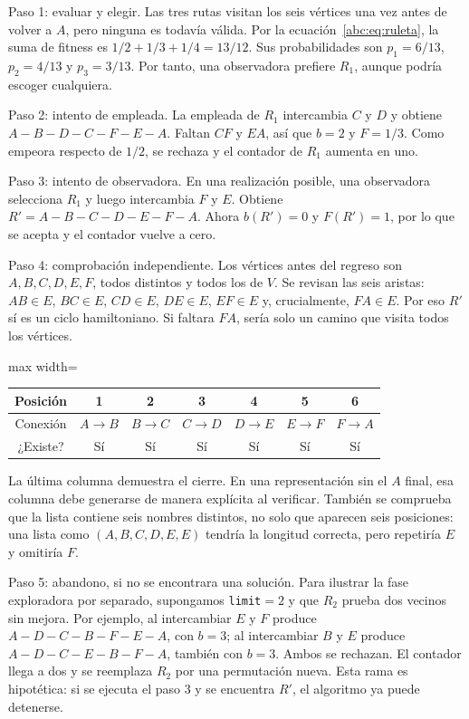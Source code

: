 \noindent Paso 1: evaluar y elegir. Las tres rutas visitan los seis vértices una vez antes de volver a $A$, pero ninguna es todavía válida. Por la ecuación~\eqref{abc:eq:ruleta}, la suma de fitness es $1/2+1/3+1/4=13/12$. Sus probabilidades son $p_1=6/13$, $p_2=4/13$ y $p_3=3/13$. Por tanto, una observadora prefiere $R_1$, aunque podría escoger cualquiera.

\noindent Paso 2: intento de empleada. La empleada de $R_1$ intercambia $C$ y $D$ y obtiene $A-B-D-C-F-E-A$. Faltan $CF$ y $EA$, así que $b=2$ y $F=1/3$. Como empeora respecto de $1/2$, se rechaza y el contador de $R_1$ aumenta en uno.

\noindent Paso 3: intento de observadora. En una realización posible, una observadora selecciona $R_1$ y luego intercambia $F$ y $E$. Obtiene $R'=A-B-C-D-E-F-A$. Ahora $b(R')=0$ y $F(R')=1$, por lo que se acepta y el contador vuelve a cero.

\noindent Paso 4: comprobación independiente. Los vértices antes del regreso son $A,B,C,D,E,F$, todos distintos y todos los de $V$. Se revisan las seis aristas: $AB\in E$, $BC\in E$, $CD\in E$, $DE\in E$, $EF\in E$ y, crucialmente, $FA\in E$. Por eso $R'$ sí es un ciclo hamiltoniano. Si faltara $FA$, sería solo un camino que visita todos los vértices.

\begin{center}

\begin{adjustbox}{max width=\linewidth}
\begin{tabular}{ccccccc}
\toprule
Posición & 1 & 2 & 3 & 4 & 5 & 6\\
\midrule
Conexión & $A\!\to\!B$ & $B\!\to\!C$ & $C\!\to\!D$ & $D\!\to\!E$ & $E\!\to\!F$ & $F\!\to\!A$\\
¿Existe? & Sí & Sí & Sí & Sí & Sí & Sí\\
\bottomrule
\end{tabular}
\end{adjustbox}
\end{center}

La última columna demuestra el cierre. En una representación sin el $A$ final, esa columna debe generarse de manera explícita al verificar. También se comprueba que la lista contiene seis nombres distintos, no solo que aparecen seis posiciones: una lista como $(A,B,C,D,E,E)$ tendría la longitud correcta, pero repetiría $E$ y omitiría $F$.

\noindent Paso 5: abandono, si no se encontrara una solución. Para ilustrar la fase exploradora por separado, supongamos \texttt{limit}$=2$ y que $R_2$ prueba dos vecinos sin mejora. Por ejemplo, al intercambiar $E$ y $F$ produce $A-D-C-B-F-E-A$, con $b=3$; al intercambiar $B$ y $E$ produce $A-D-C-E-B-F-A$, también con $b=3$. Ambos se rechazan. El contador llega a dos y se reemplaza $R_2$ por una permutación nueva. Esta rama es hipotética: si se ejecuta el paso 3 y se encuentra $R'$, el algoritmo ya puede detenerse.


